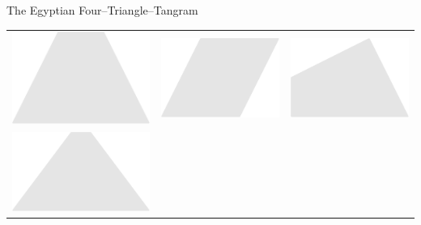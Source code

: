 \documentclass[14pt]{beamer}
\begin{document}
\begin{frame}{The Egyptian Four--Triangle--Tangram}
\begin{center}
\begin{tabular}{ccc}
                    \includegraphics[scale=0.3]{figures/figure023d.pdf} \;\;&
                \;\;\includegraphics[scale=0.3]{figures/figure023f.pdf} \;\;&
                \;\;\includegraphics[scale=0.3]{figures/figure023h.pdf} \\[2ex]
                    \includegraphics[scale=0.3]{figures/figure023e.pdf} \;\;&

\end{tabular}
\end{center}
\end{frame}
\end{document}
